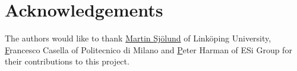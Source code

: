 \documentclass[11pt,a4paper,twocolumn]{article}
\renewcommand{\normalsize}{\fontsize{10.5pt}{12.3pt}\selectfont}
\renewcommand{\small}{\fontsize{9.5pt}{11.1pt}\selectfont}
\begin{document}
\section{Acknowledgements}
\label{sec:acknowledgements}

The authors would like to thank
\href{mailto:martin.sjolund@liu.se}{Martin Sj\"olund} of Link\"oping
University, \href{mailto:francesco.casella@polimi.it}Francesco Casella
of Politecnico di Milano and \href{mailto:Peter.Harman@esi-group.com}
Peter Harman of ESi Group for their contributions to this project.


\small
\printbibliography
\normalsize
\end{document}

